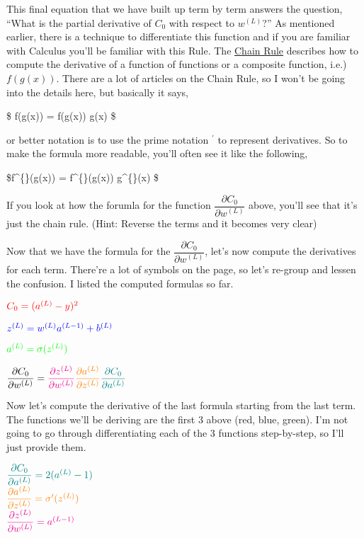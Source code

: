 \documentclass[11pt]{article}
\begin{document}
This final equation that we have built up term by term answers the
question, ``What is the partial derivative of \(C_0\) with respect to
\(w^{(L)}\)?'' As mentioned earlier, there is a technique to
differentiate this function and if you are familiar with Calculus you'll
be familiar with this Rule. The
\href{https://en.wikipedia.org/wiki/Chain_rule}{Chain Rule} describes
how to compute the derivative of a function of functions or a composite
function, i.e.) \(f(g(x))\). There are a lot of articles on the Chain
Rule, so I won't be going into the details here, but basically it says,

\$ f(g(x)) =  f(g(x))  g(x) \$

or better notation is to use the prime notation \(^{\prime}\) to
represent derivatives. So to make the formula more readable, you'll
often see it like the following,

\$f\^{}\{\prime\}(g(x)) = f\^{}\{\prime\}(g(x)) g\^{}\{\prime\}(x) \$

If you look at how the forumla for the function
\(\dfrac{\partial C_0}{\partial w^{(L)}}\) above, you'll see that it's
just the chain rule. (Hint: Reverse the terms and it becomes very clear)

Now that we have the formula for the
\(\dfrac{\partial C_0}{\partial w^{(L)}}\), let's now compute the
derivatives for each term. There're a lot of symbols on the page, so
let's re-group and lessen the confusion. I listed the computed formulas
so far.

\(\color{red}{ C_0 = (a^{(L)} - y)^{2} }\)

\(\color{blue}{ z^{(L)} = w^{(L)}a^{(L-1)}+b^{(L)} }\)

\(\color{green}{ a^{(L)} = \sigma(z^{(L)}) }\)

\(\dfrac{\partial C_0}{\partial w^{(L)}} = \color{magenta}{ \dfrac{\partial z^{(L)}}{\partial w^{(L)}} } \color{orange}{ \dfrac{\partial a^{(L)}}{\partial z^{(L)}} } \color{teal}{ \dfrac{\partial C_0}{\partial a^{(L)}} }\)

Now let's compute the derivative of the last formula starting from the
last term. The functions we'll be deriving are the first 3 above
({red},{ blue},{ green}). I'm not going to go through differentiating
each of the 3 functions step-by-step, so I'll just provide them.

\(\color{teal}{ \dfrac{\partial C_0}{\partial a^{(L)}} } = 2(a^{(L)} - 1)\)\\
\(\color{orange}{ \dfrac{\partial a^{(L)}}{\partial z^{(L)}} } = \sigma^{\prime}(z^{(L)})\)\\
\(\color{magenta}{ \dfrac{\partial z^{(L)}}{\partial w^{(L)}} } = a^{(L-1)}\)
\end{document}
